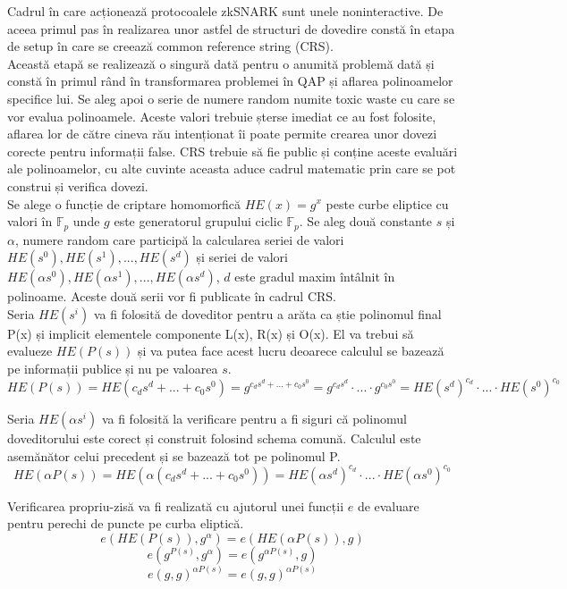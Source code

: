 Cadrul în care acționează protocoalele zkSNARK sunt unele noninteractive. De aceea primul pas în realizarea unor astfel de structuri de dovedire constă în etapa de setup în care se creează common reference string (CRS).\\

Această etapă se realizează o singură dată pentru o anumită problemă dată și constă în primul rând în  transformarea problemei în QAP și aflarea polinoamelor specifice lui. Se aleg apoi o serie de numere random numite toxic waste cu care se vor evalua polinoamele. Aceste valori trebuie șterse imediat ce au fost folosite, aflarea lor de către cineva rău intenționat îi poate permite crearea unor dovezi corecte pentru informații false. CRS trebuie să fie public și conține aceste evaluări ale polinoamelor, cu alte cuvinte aceasta aduce cadrul matematic prin care se pot construi și verifica dovezi.\\

Se alege o funcție de criptare homomorfică $HE(x) = g^x$ peste curbe eliptice cu valori în $\mathbb{F}_p$ unde $g$ este generatorul grupului ciclic $\mathbb{F}_p$. Se aleg două constante $s$ și $\alpha$, numere random care participă la calcularea seriei de valori $HE(s^0),HE(s^1),...,HE(s^d)$ și seriei de valori $HE(\alpha s^0),HE(\alpha s^1),...,HE(\alpha s^d)$, $d$ este gradul maxim întâlnit în polinoame. Aceste două serii vor fi publicate în cadrul CRS.\\

Seria $HE(s^i)$ va fi folosită de doveditor pentru a arăta ca știe polinomul final P(x) și implicit elementele componente L(x), R(x) și O(x). El va trebui să evalueze $HE(P(s))$ și va putea face acest lucru deoarece calculul se bazează pe informații publice și nu pe valoarea $s$.
\[ HE(P(s)) = HE(c_ds^d + ... + c_0s^0) = g^{c_ds^d + ... + c_0s^0} = g^{c_ds^d} \cdot ... \cdot g^{c_0s^0} = HE(s^d)^{c_d} \cdot ... \cdot HE(s^0)^{c_0} \]

Seria $HE(\alpha s^i)$ va fi folosită la verificare pentru a fi siguri că polinomul doveditorului este corect și construit folosind schema comună. Calculul este asemănător celui precedent și se bazează tot pe polinomul P.
\[ HE(\alpha P(s)) = HE(\alpha (c_ds^d + ... + c_0s^0)) = HE(\alpha s^d)^{c_d} \cdot ... \cdot HE(\alpha s^0)^{c_0} \]

Verificarea propriu-zisă va fi realizată cu ajutorul unei funcții $e$ de evaluare pentru perechi de puncte pe curba eliptică.
\[ e(HE(P(s)), g^{\alpha}) = e(HE(\alpha P(s)), g) \]
\[ e(g^{P(s)}, g^{\alpha}) = e(g^{\alpha P(s)}, g) \]
\[ e(g,g)^{\alpha P(s)} = e(g,g)^{\alpha P(s)} \]

